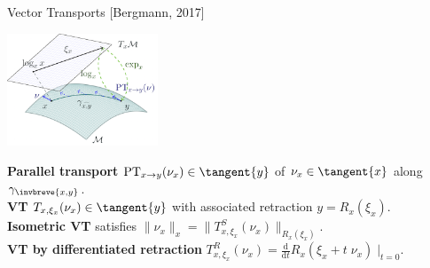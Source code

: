 \documentclass[9.4pt]{beamer}
\begin{document}
\begin{frame}{Vector Transports}
    \vspace{-1\baselineskip}\hfill{\tiny{[Bergmann, 2017]}}
    \begin{center}
        \includegraphics[width=4.5cm]{img/manifold-terms.png}
    \end{center}
    \textbf{Parallel transport} $\mathrm{PT}_{x \rightarrow y} (\nu_x) \in \tangent{y}$ of $\nu_x \in \tangent{x}$ along $\gamma_{\invbreve{x,y}}$. \\[0.15\baselineskip]
    \textbf{VT} $T_{x, \xi_x}(\nu_x) \in \tangent{y}$ with associated retraction $y = R_x(\xi_x)$. \\[0.15\baselineskip]
    \textbf{Isometric VT} satisfies $\lVert \nu_x \rVert_x = \lVert T^{S}_{x, \xi_x}(\nu_x) \rVert_{R_x(\xi_x)}$. \\[0.15\baselineskip]
    \textbf{VT by differentiated retraction} $T^{R}_{x, \xi_x}(\nu_x) = \frac{\mathrm{d}}{\mathrm{d}t} R_{x}(\xi_x + t \; \nu_x) \; \vert_{t=0}$.
\end{frame}
\end{document}
